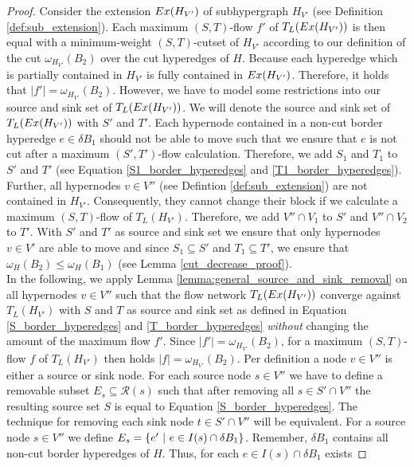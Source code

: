 \begin{proof}
Consider the extension $Ex(H_{V'})$ of subhypergraph $H_{V'}$ (see Definition \ref{def:sub_extension}).
Each maximum $(S,T)$-flow $f'$ of $T_L(Ex(H_{V'}))$ is then equal with a minimum-weight
$(S,T)$-cutset of $H_{V'}$ according to our definition of the cut $\omega_{H_{V'}}(B_2)$ over
the cut hyperedges of $H$. Because each hyperedge which is partially contained in $H_{V'}$
is fully contained in $Ex(H_{V'})$. Therefore, it holds that $|f'| = \omega_{H_{V'}}(B_2)$.
However, we have to model some restrictions into our source and sink set of $T_L(Ex(H_{V'}))$.
We will denote the source and sink set of $T_L(Ex(H_{V'}))$ with $S'$ and $T'$.
Each hypernode contained in a non-cut border hyperedge $e \in \delta B_1$ should not be able to move
such that we ensure that $e$ is not cut after a maximum $(S',T')$-flow calculation. Therefore,
we add $S_1$ and $T_1$ to $S'$ and $T'$ (see Equation \ref{S1_border_hyperedges} and \ref{T1_border_hyperedges}).
Further, all hypernodes $v \in V''$ (see Defintion \ref{def:sub_extension}) are not contained in
$H_{V'}$. Consequently, they cannot change their block if we calculate a maximum $(S,T)$-flow of
$T_L(H_{V'})$. Therefore, we add $V'' \cap V_1$ to $S'$ and $V'' \cap V_2$ to $T'$.
With $S'$ and $T'$ as source and sink set we ensure that only hypernodes $v \in V'$ are able
to move and since $S_1 \subseteq S'$ and $T_1 \subseteq T'$, we ensure that $\omega_H(B_2) \le \omega_H(B_1)$
(see Lemma \ref{cut_decrease_proof}). \\
In the following, we apply Lemma \ref{lemma:general_source_and_sink_removal} on all
hypernodes $v \in V''$ such that the flow network $T_L(Ex(H_{V'}))$ converge against
$T_L(H_{V'})$ with $S$ and $T$ as source and sink set as defined in Equation 
\ref{S_border_hyperedges} and \ref{T_border_hyperedges} \emph{without} changing the
amount of the maximum flow $f'$. Since $|f'| = \omega_{H_{V'}}(B_2)$, for a maximum $(S,T)$-flow
$f$ of $T_L(H_{V'})$ then holds $|f| = \omega_{H_{V'}}(B_2)$. Per definition a node $v \in V''$
is either a source or sink node. For each source node $s \in V''$ we have to 
define a removable subset $E_s \subseteq \mathcal{R}(s)$ such that after removing all $s \in S' \cap V''$
the resulting source set $S$ is equal to Equation \ref{S_border_hyperedges}. The technique
for removing each sink node $t \in S' \cap V''$ will be equivalent. For a source node $s \in V''$
we define $E_s = \{e'\ |\ e \in I(s) \cap \delta B_1\}$. Remember, $\delta B_1$ contains
all non-cut border hyperedges of $H$. Thus, for each $e \in I(s) \cap \delta B_1$ exists

\end{proof}
